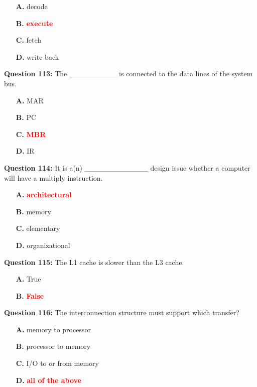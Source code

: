 \documentclass[12pt,a4paper]{article}
\begin{document}
\begin{itemize}
    \item[\textbf{A.}] decode
    \item[\textbf{B.}] \textcolor{red}{\textbf{execute}}
    \item[\textbf{C.}] fetch
    \item[\textbf{D.}] write back
\end{itemize}

\vspace{0.5cm}

\textbf{Question 113:} The _________ is connected to the data lines of the system bus.

\begin{itemize}
    \item[\textbf{A.}] MAR
    \item[\textbf{B.}] PC
    \item[\textbf{C.}] \textcolor{red}{\textbf{MBR}}
    \item[\textbf{D.}] IR
\end{itemize}

\vspace{0.5cm}

\textbf{Question 114:} It is a(n) ____________ design issue whether a computer will have a multiply instruction.

\begin{itemize}
    \item[\textbf{A.}] \textcolor{red}{\textbf{architectural}}
    \item[\textbf{B.}] memory
    \item[\textbf{C.}] elementary
    \item[\textbf{D.}] organizational
\end{itemize}

\vspace{0.5cm}

\textbf{Question 115:} The L1 cache is slower than the L3 cache.

\begin{itemize}
    \item[\textbf{A.}] True
    \item[\textbf{B.}] \textcolor{red}{\textbf{False}}
\end{itemize}

\vspace{0.5cm}

\textbf{Question 116:} The interconnection structure must support which transfer?

\begin{itemize}
    \item[\textbf{A.}] memory to processor
    \item[\textbf{B.}] processor to memory
    \item[\textbf{C.}] I/O to or from memory
    \item[\textbf{D.}] \textcolor{red}{\textbf{all of the above}}
\end{itemize}
\end{document}
